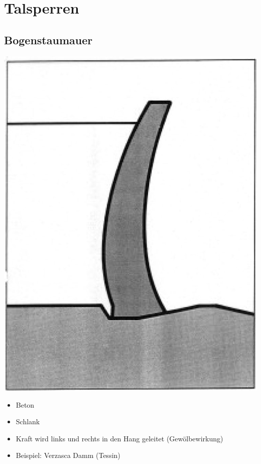 \section{Talsperren}


\subsection{Bogenstaumauer}

\begin{minipage}[c]{0.38\columnwidth}
    \includegraphics[width=0.98\columnwidth, align=c]{images/Talsperre_1.jpg}
\end{minipage}
\hfill
\begin{minipage}[t]{0.58\columnwidth}
    \begin{itemize}
    \item Beton
    \item Schlank
    \item Kraft wird links und rechts in den Hang geleitet (Gewölbewirkung)
    \item Beispiel: Verzasca Damm (Tessin)
    \end{itemize}
\end{minipage}



